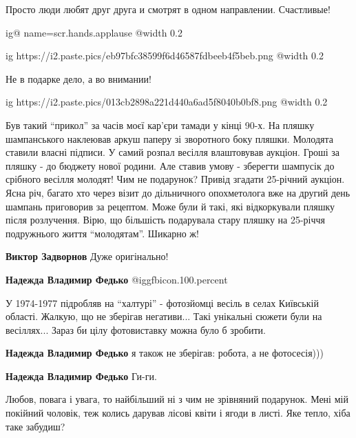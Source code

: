 \begin{multicols}{2}
\begin{itemize}
Просто люди любят друг друга и смотрят в одном направлении. Счастливые!


\ifcmt
  ig@ name=scr.hands.applause
  @width 0.2
\fi


\ifcmt
  ig https://i2.paste.pics/eb97bfc38599f6d46587fdbeeb4f5beb.png
  @width 0.2
\fi

Не в подарке дело, а во внимании!

\ifcmt
  ig https://i2.paste.pics/013cb2898a221d440a6ad5f8040b0bf8.png
  @width 0.2
\fi


Був такий \enquote{прикол} за часів моєї кар'єри тамади у кінці 90-х. На пляшку
шампанського наклеював аркуш паперу зі зворотного боку пляшки. Молодята ставили
власні підписи. У самий розпал весілля влаштовував аукціон. Гроші за пляшку -
до бюджету нової родини. Але ставив умову - зберегти шампусік до срібного
весілля молодят! Чим не подарунок? Привід згадати 25-річний аукціон. Ясна річ,
багато хто через візит до дільничного опохметолога вже на другий день шампань
приговорив за рецептом. Може були й такі, які відкоркували пляшку після
розлучення. Вірю, що більшість подарувала стару пляшку на 25-річчя подружнього
життя \enquote{молодятам}. Шикарно ж!

\begin{itemize} %
\textbf{Виктор Задворнов} Дуже оригінально!

\textbf{Надежда Владимир Федько}  @igg{fbicon.100.percent} 


У 1974-1977 підробляв на \enquote{халтурі} - фотозйомці весіль в селах Київській
області. Жалкую, що не зберігав негативи... Такі унікальні сюжети були на
весіллях... Зараз би цілу фотовиставку можна було б зробити.


\textbf{Надежда Владимир Федько} я також не зберігав: робота, а не фотосесія)))

\textbf{Надежда Владимир Федько} Ги-ги.


Любов, повага і увага, то найбільший ні з чим не зрівняний подарунок. Мені мій
покійний чоловік, теж колись дарував лісові квіти і ягоди в листі. Яке тепло,
хіба таке забудиш?


\end{itemize}
\end{itemize}
\end{multicols}
